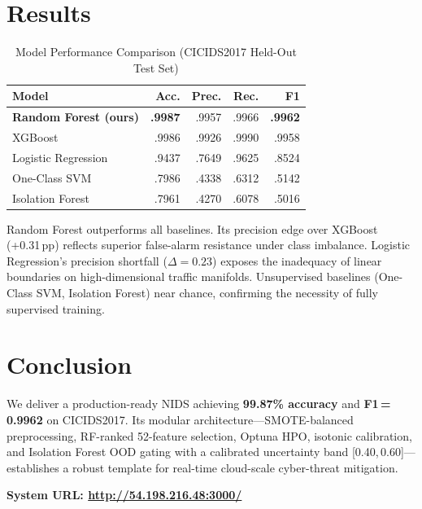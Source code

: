 \documentclass[9pt,conference]{IEEEtran}
\begin{document}
\section{Results}

\begin{table}[!h]
\caption{Model Performance Comparison (CICIDS2017 Held-Out Test Set)}
\begin{center}
\setlength{\tabcolsep}{4.0pt}
\begin{tabular}{l r r r r}
\toprule
\textbf{Model} & \textbf{Acc.} & \textbf{Prec.} & \textbf{Rec.} & \textbf{F1} \\
\midrule
\textbf{Random Forest (ours)} & \textbf{.9987} & .9957 & .9966 & \textbf{.9962} \\
XGBoost                       & .9986          & .9926 & .9990 & .9958 \\
Logistic Regression           & .9437          & .7649 & .9625 & .8524 \\
One-Class SVM                 & .7986          & .4338 & .6312 & .5142 \\
Isolation Forest              & .7961          & .4270 & .6078 & .5016 \\
\bottomrule
\end{tabular}
\label{tab:models}
\end{center}
\end{table}

Random Forest outperforms all baselines. Its precision edge over XGBoost (+0.31\,pp) reflects superior false-alarm resistance under class imbalance. Logistic Regression's precision shortfall ($\Delta\!=\!0.23$) exposes the inadequacy of linear boundaries on high-dimensional traffic manifolds. Unsupervised baselines (One-Class SVM, Isolation Forest) near chance, confirming the necessity of fully supervised training.

\section{Conclusion}
We deliver a production-ready NIDS achieving \textbf{99.87\% accuracy} and \textbf{F1\,=\,0.9962} on CICIDS2017. Its modular architecture---SMOTE-balanced preprocessing, RF-ranked 52-feature selection, Optuna HPO, isotonic calibration, and Isolation Forest OOD gating with a calibrated uncertainty band [0.40,\,0.60]---establishes a robust template for real-time cloud-scale cyber-threat mitigation.

\vspace{5pt}
\noindent\textbf{System URL: \href{http://54.198.216.48:3000/}{http://54.198.216.48:3000/}}
\end{document}
